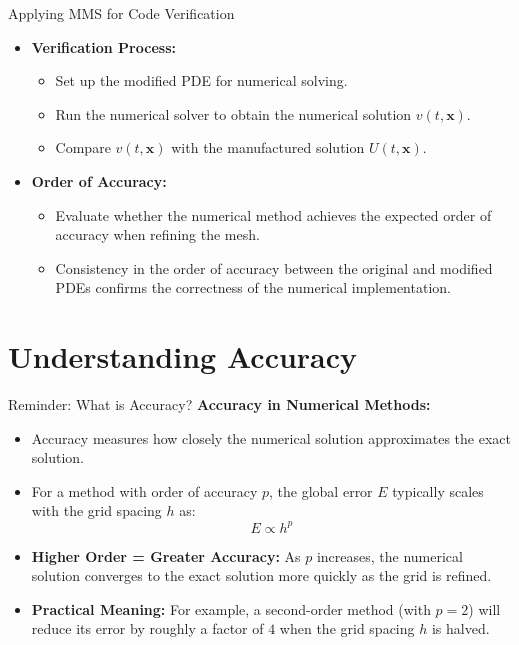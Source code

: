 \documentclass{beamer}
\begin{document}
\begin{frame}{Applying MMS for Code Verification}
    \begin{itemize}
        \item \textbf{Verification Process:}
            \begin{itemize}
                \item Set up the modified PDE for numerical solving.
                \item Run the numerical solver to obtain the numerical solution $v(t,\mathbf{x})$.
                \item Compare $v(t,\mathbf{x})$ with the manufactured solution $U(t,\mathbf{x})$.
            \end{itemize}
        \item \textbf{Order of Accuracy:}
            \begin{itemize}
                \item Evaluate whether the numerical method achieves the expected order of accuracy when refining the mesh.
                \item Consistency in the order of accuracy between the original and modified PDEs confirms the correctness of the numerical implementation.
            \end{itemize}
    \end{itemize}
\end{frame}

\section{Understanding Accuracy}

\begin{frame}{Reminder: What is Accuracy?}
    \textbf{Accuracy in Numerical Methods:}
    \begin{itemize}
        \item Accuracy measures how closely the numerical solution approximates the exact solution.
        \item For a method with order of accuracy \( p \), the global error \( E \) typically scales with the grid spacing \( h \) as:
        \[
            E \propto h^p
        \]
        \item \textbf{Higher Order = Greater Accuracy:} As \( p \) increases, the numerical solution converges to the exact solution more quickly as the grid is refined.
        \item \textbf{Practical Meaning:} For example, a second-order method (with \( p = 2 \)) will reduce its error by roughly a factor of \( 4 \) when the grid spacing \( h \) is halved.
    \end{itemize}
\end{frame}
\end{document}
